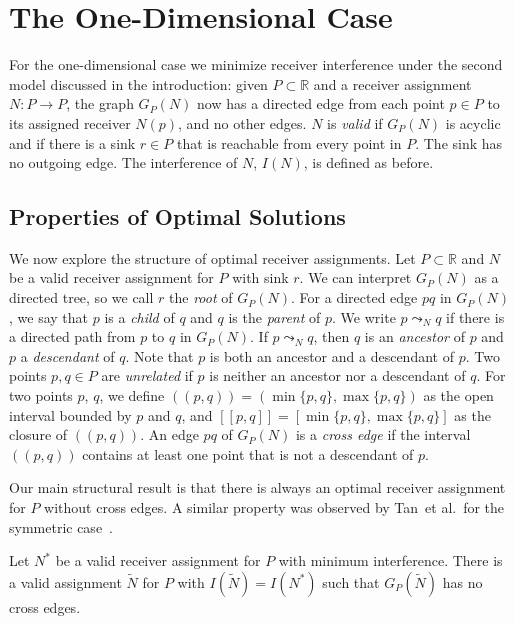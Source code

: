 \documentclass[envcountsect,envcountsame,runningheads,a4paper]{llncs}
\newcommand\R{{\mathbb R}}
\begin{document}
\section{The One-Dimensional Case}

For the one-dimensional case we
minimize receiver interference under the second model discussed in the introduction:
given $P \subset \R$ and
a receiver assignment
$N: P \rightarrow P$, the graph
$G_P(N)$ now has a directed edge from each point $p \in P$
to its assigned receiver $N(p)$, and no other edges.
$N$ is \emph{valid} if $G_P(N)$ is acyclic and if
there is a sink $r \in P$ that is reachable from every
point in $P$. The sink has no outgoing edge. The interference
of $N$, $I(N)$,  is defined as before.

\subsection{Properties of Optimal Solutions}

We now explore the structure of optimal
receiver assignments. Let $P \subset \R$ and $N$ be a valid receiver
assignment for $P$ with sink $r$. We can interpret
$G_P(N)$ as a directed tree, so we
call $r$ the \emph{root} of $G_P(N)$.
For a directed edge $pq$ in $G_P(N)$, we say that $p$ is a \emph{child} of $q$
and $q$ is the \emph{parent} of $p$.
We write $p \leadsto_N q$ if there is a
directed path from $p$ to $q$ in $G_P(N)$.
If $p \leadsto_N q$,
then $q$ is an \emph{ancestor} of $p$ and
$p$ a
\emph{descendant} of $q$. Note that $p$ is both an
ancestor and a descendant of $p$. Two points $p, q \in P$ are \emph{unrelated}
if $p$ is neither an ancestor nor a descendant of $q$.
For two points $p$, $q$, we define $((p,q)) = (\min\{p,q\}, \max\{p,q\})$
as the open interval bounded by $p$ and $q$, and
$[[p,q]] = [\min\{p,q\}, \max\{p,q\}]$ as the closure of
$((p, q))$.
An edge $pq$ of $G_P(N)$ is a \emph{cross edge}
if the interval $((p,q))$ contains at least one point that is
not a descendant of $p$.

Our main structural result is that there is always an optimal
receiver assignment for $P$ without cross edges.
A similar property was observed by Tan~et al.~for the
symmetric case~\cite{TanLoWaHuLa11}.

\begin{lemma}\label{lem:nocross}
Let $N^*$ be a valid receiver assignment for $P$ with
minimum interference.
There is a valid assignment $\widetilde{N}$ for $P$ with
$I(\widetilde{N}) = I(N^*)$
such that $G_P(\widetilde{N})$ has no cross edges.
\end{lemma}
\end{document}
